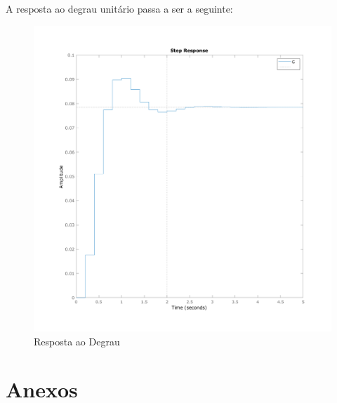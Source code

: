 \documentclass[a4paper,11pt]{article}
\begin{document}
A resposta ao degrau unitário passa a ser a seguinte:

\begin{figure}[H]
    \centering
    \includegraphics[width=0.9\linewidth]{img/exsim3-step-g2-control.png}
    \caption{Resposta ao Degrau}
    \label{fig:ex3-step-g2-control}
\end{figure}




\nocite{sympy}
\nocite{pythontex}
\nocite{matlabcontrol}
\nocite{matlabsymbolic}

\newpage
\section*{Anexos}
\end{document}
